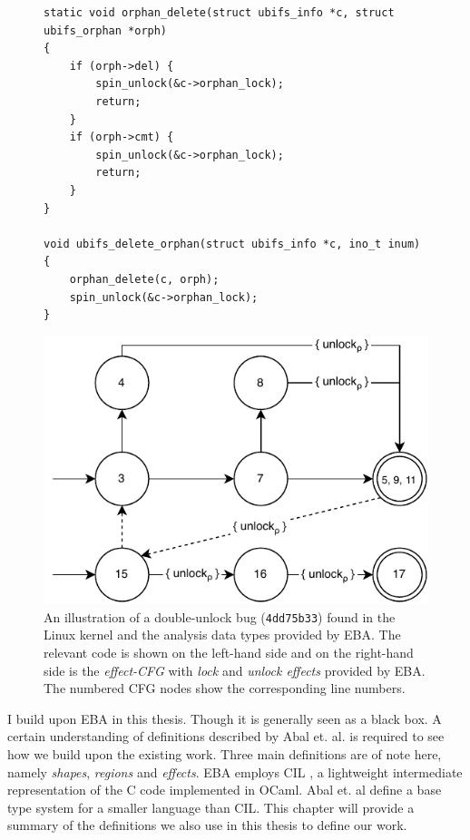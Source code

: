\begin{figure}[H]
\centering
\begin{minipage}{0.4\textwidth}
    \begin{verbatim}
static void orphan_delete(struct ubifs_info *c, struct ubifs_orphan *orph)
{
	if (orph->del) {
		spin_unlock(&c->orphan_lock);
		return;
	}
	if (orph->cmt) {
		spin_unlock(&c->orphan_lock);
		return;
	}
}

void ubifs_delete_orphan(struct ubifs_info *c, ino_t inum)
{
	orphan_delete(c, orph);
	spin_unlock(&c->orphan_lock);
}
\end{verbatim}
\end{minipage}
\hspace*{0.05\textwidth}
\begin{minipage}{0.45\textwidth}
    \includegraphics[width=\textwidth]{background/figures/annotated-cfg}
\end{minipage}
\caption{An illustration of a double-unlock bug (\texttt{4dd75b33}) found in the Linux kernel and the analysis data types provided by EBA. The relevant code is shown on the left-hand side and on the right-hand side is the \textit{effect-CFG} with \textit{lock} and \textit{unlock effects} provided by EBA. The numbered CFG nodes show the corresponding line numbers.}
\label{initial-bug-visualisation}
\end{figure}

\newpar I build upon EBA in this thesis. Though it is generally seen as a black box. A certain understanding of definitions described by Abal et. al. \cite{Abal2017EffectiveBF} is required to see how we build upon the existing work. Three main definitions are of note here, namely \textit{shapes}, \textit{regions} and \textit{effects}. EBA employs CIL \cite{cil}, a lightweight intermediate representation of the C code implemented in OCaml. Abal et. al define a base type system for a smaller language than CIL. This chapter will provide a summary of the definitions we also use in this thesis to define our work. 

